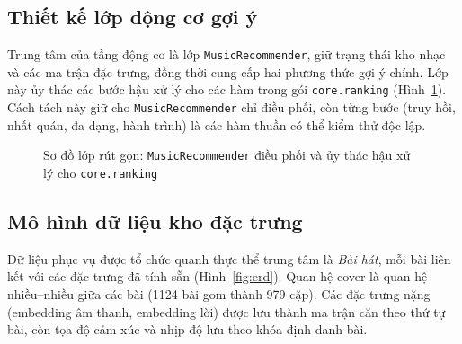 \documentclass[../DoAn.tex]{subfiles}
\begin{document}
\subsection{Thiết kế lớp động cơ gợi ý}
\label{subsection:4.1.5}
Trung tâm của tầng động cơ là lớp \texttt{MusicRecommender}, giữ trạng thái kho nhạc và các ma trận đặc trưng, đồng thời cung cấp hai phương thức gợi ý chính. Lớp này ủy thác các bước hậu xử lý cho các hàm trong gói \texttt{core.ranking} (Hình~\ref{fig:class}). Cách tách này giữ cho \texttt{MusicRecommender} chỉ điều phối, còn từng bước (truy hồi, nhất quán, đa dạng, hành trình) là các hàm thuần có thể kiểm thử độc lập.

\begin{figure}[tbp]
\centering
{}
\caption{Sơ đồ lớp rút gọn: \texttt{MusicRecommender} điều phối và ủy thác hậu xử lý cho \texttt{core.ranking}}
\label{fig:class}
\end{figure}

\subsection{Mô hình dữ liệu kho đặc trưng}
\label{subsection:4.1.6}
Dữ liệu phục vụ được tổ chức quanh thực thể trung tâm là \textit{Bài hát}, mỗi bài liên kết với các đặc trưng đã tính sẵn (Hình~\ref{fig:erd}). Quan hệ cover là quan hệ nhiều--nhiều giữa các bài (1124 bài gom thành 979 cặp). Các đặc trưng nặng (embedding âm thanh, embedding lời) được lưu thành ma trận căn theo thứ tự bài, còn tọa độ cảm xúc và nhịp độ lưu theo khóa định danh bài.
\end{document}
